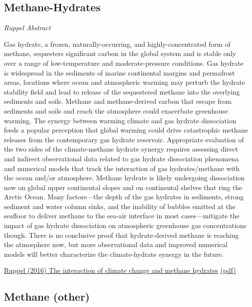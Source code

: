 \documentclass[
]{book}
\begin{document}
\hypertarget{methane-hydrates}{%
\subsection{Methane-Hydrates}\label{methane-hydrates}}

\emph{Ruppel Abstract}

Gas hydrate, a frozen, naturally-occurring, and highly-concentrated form of methane, sequesters significant carbon in the global system and is stable only over a range of low-temperature and moderate-pressure conditions. Gas hydrate is widespread in the sediments of marine continental margins and permafrost areas, locations where ocean and atmospheric warming may perturb the hydrate stability field and lead to release of the sequestered methane into the overlying sediments and soils. Methane and methane-derived carbon that escape from sediments and soils and reach the atmosphere could exacerbate greenhouse warming. The synergy between warming climate and gas hydrate dissociation feeds a popular perception that global warming could drive catastrophic methane releases from the contemporary gas hydrate reservoir. Appropriate evaluation of the two sides of the climate-methane hydrate synergy requires assessing direct and indirect observational data related to gas hydrate dissociation phenomena and numerical models that track the interaction of gas hydrates/methane with the ocean and/or atmosphere. Methane hydrate is likely undergoing dissociation now on global upper continental slopes and on continental shelves that ring the Arctic Ocean. Many factors---the depth of the gas hydrates in sediments, strong sediment and water column sinks, and the inability of bubbles emitted at the seafloor to deliver methane to the sea-air interface in most cases---mitigate the impact of gas hydrate dissociation on atmospheric greenhouse gas concentrations though. There is no conclusive proof that hydrate-derived methane is reaching the atmosphere now, but more observational data and improved numerical models will better characterize the climate-hydrate synergy in the future.

\href{https://agupubs.onlinelibrary.wiley.com/doi/full/10.1002/2016RG000534}{Ruppel (2016) The interaction of climate change and methane hydrates}
\href{pdf/Ruppel_2016_Methane_Hydrates.pdf}{(pdf)}

\hypertarget{methane-other}{%
\subsection{Methane (other)}\label{methane-other}}
\end{document}

